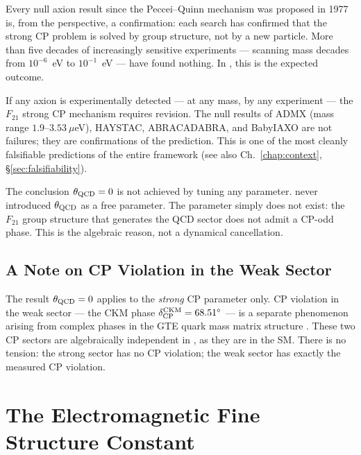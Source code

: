 \documentclass[11pt,openany]{book}
\theoremstyle{remark}
\newcommand{\GTE}{\text{GTE}}
\begin{document}
Every null axion result since the Peccei--Quinn mechanism was proposed in 1977 is, from
the \GTE{} perspective, a confirmation: each search has confirmed that the strong CP
problem is solved by group structure, not by a new particle.  More than five decades of
increasingly sensitive experiments --- scanning mass decades from $10^{-6}$~eV to
$10^{-1}$~eV --- have found nothing.  In \GTE{}, this is the expected outcome.

If any axion is experimentally detected --- at any mass, by any experiment --- the
$F_{21}$ strong CP mechanism requires revision.  The null results of ADMX (mass range
$1.9$--$3.53~\mu$eV), HAYSTAC, ABRACADABRA, and BabyIAXO are not failures; they are
confirmations of the \GTE{} prediction.  This is one of the most cleanly falsifiable
predictions of the entire framework (see also
Ch.~\ref{chap:context}, \S\ref{sec:falsifiability}).

\begin{tcolorbox}[colback=yellow!8,colframe=yellow!60!black,title={The Strong CP Result Is Not Fitted}]
The conclusion $\theta_{\rm QCD} = 0$ is not achieved by tuning any parameter.
\GTE{} never introduced $\theta_{\rm QCD}$ as a free parameter.  The parameter simply
does not exist: the $F_{21}$ group structure that generates the QCD sector does not
admit a CP-odd phase.  This is the algebraic reason, not a dynamical cancellation.
\end{tcolorbox}

\subsection*{A Note on CP Violation in the Weak Sector}

The result $\theta_{\rm QCD} = 0$ applies to the \emph{strong} CP parameter only.
CP violation in the weak sector --- the CKM phase $\delta_{\rm CP}^{\rm CKM} =
68.51^\circ$ --- is a separate phenomenon arising from complex phases in the GTE quark
mass matrix structure \cite{SpivackCKM}.  These two CP sectors are algebraically
independent in \GTE{}, as they are in the SM.  There is no tension: the strong sector
has no CP violation; the weak sector has exactly the measured CP violation.

\section{The Electromagnetic Fine Structure Constant}
\label{sec:alpha}
\end{document}
